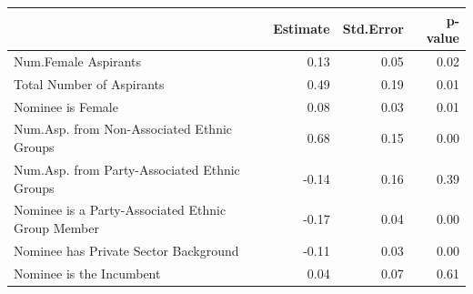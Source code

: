 \begin{table}[ht]
\centering
\label{tab:results.ols}
\begin{tabular}{lrrr}
  \hline
 & Estimate & Std.Error & p-value \\ 
  \hline
Num.Female Aspirants & 0.13 & 0.05 & 0.02 \\ 
  Total Number of Aspirants & 0.49 & 0.19 & 0.01 \\ 
  Nominee is Female & 0.08 & 0.03 & 0.01 \\ 
  Num.Asp. from Non-Associated Ethnic Groups & 0.68 & 0.15 & 0.00 \\ 
  Num.Asp. from Party-Associated Ethnic Groups & -0.14 & 0.16 & 0.39 \\ 
  Nominee is a Party-Associated Ethnic Group Member & -0.17 & 0.04 & 0.00 \\ 
  Nominee has Private Sector Background & -0.11 & 0.03 & 0.00 \\ 
  Nominee is the Incumbent & 0.04 & 0.07 & 0.61 \\ 
   \hline
\end{tabular}
\end{table}
